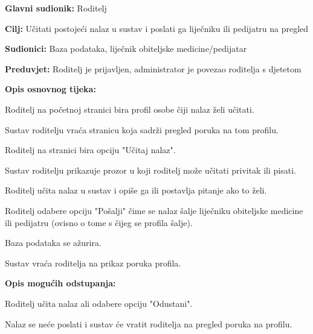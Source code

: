 				
					
					\noindent {}
					\begin{packed_item}
						
						\item \textbf{Glavni sudionik: }Roditelj
						\item  \textbf{Cilj:} Učitati postojeći nalaz u sustav i poslati ga liječniku ili pedijatru na pregled
						\item  \textbf{Sudionici:} Baza podataka, liječnik obiteljske medicine/pedijatar
						\item  \textbf{Preduvjet:} Roditelj je prijavljen, administrator je povezao roditelja s djetetom
						\item  \textbf{Opis osnovnog tijeka:}
						
						\item[] \begin{packed_enum}
							
							\item Roditelj na početnoj stranici bira profil osobe čiji nalaz želi učitati.
							\item Sustav roditelju vraća stranicu koja sadrži pregled poruka na tom profilu.
							\item Roditelj na stranici bira opciju "Učitaj nalaz".
							\item Sustav roditelju prikazuje prozor u koji roditelj može učitati privitak ili pisati.
							\item Roditelj učita nalaz u sustav i opiše ga ili postavlja pitanje ako to želi.
							\item Roditelj odabere opciju "Pošalji" čime se nalaz šalje liječniku obiteljske medicine ili pedijatru (ovisno o tome s čijeg se profila šalje).
							\item Baza podataka se ažurira.
							\item Sustav vraća roditelja na prikaz poruka profila.
						\end{packed_enum}
						
						\item  \textbf{Opis mogućih odstupanja:}
						
						\item[] \begin{packed_item}
							
							\item[6.a] Roditelj učita nalaz ali odabere opciju "Odustani".
							\item[] \begin{packed_enum}
								
								\item Nalaz se neće poslati i sustav će vratit roditelja na pregled poruka na profilu.
							\end{packed_enum}
							
							
						\end{packed_item}
					\end{packed_item}
					
